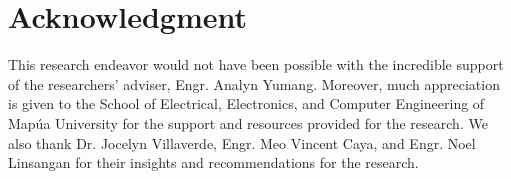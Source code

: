 \documentclass[conference]{IEEEtran}
\begin{document}
\section*{Acknowledgment}
\indent This research endeavor would not have been possible with 
the incredible support of the researchers' adviser, Engr. Analyn Yumang. Moreover, 
much appreciation is given to the School of Electrical, Electronics, and Computer
Engineering of Map\'ua University for the support and resources provided for the
research. We also thank Dr. Jocelyn Villaverde, Engr. Meo Vincent Caya, 
and Engr. Noel Linsangan for their insights and recommendations 
for the research.



\end{document}

